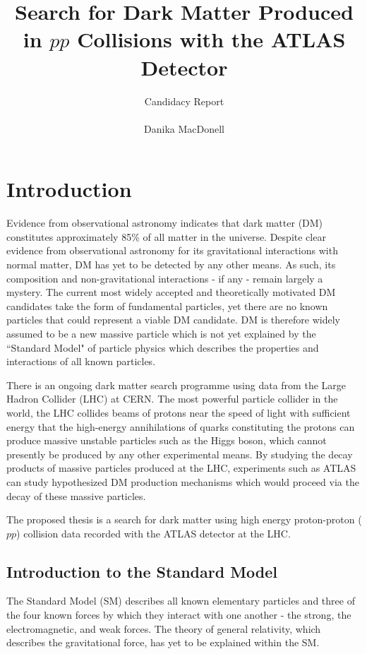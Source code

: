 \documentclass[12pt]{article}
\author{\Large{Candidacy Report} \\
\\
Danika MacDonell}
\title{Search for Dark Matter Produced in $pp$ Collisions with the ATLAS Detector}
\begin{document}
\maketitle

\section{Introduction}

Evidence from observational astronomy indicates that dark matter (DM) constitutes approximately 85\% \cite{planck} of all matter in the universe. Despite clear evidence from observational astronomy for its gravitational interactions with normal matter, DM has yet to be detected by any other means. As such, its composition and non-gravitational interactions - if any - remain largely a mystery. The current most widely accepted and theoretically motivated DM candidates take the form of fundamental particles, yet there are no known particles that could represent a viable DM candidate. DM is therefore widely assumed to be a new massive particle which is not yet explained by the ``Standard Model" of particle physics which describes the properties and interactions of all known particles. 

There is an ongoing dark matter search programme using data from the Large Hadron Collider (LHC) at CERN. The most powerful particle collider in the world, the LHC collides beams of protons near the speed of light with sufficient energy that the high-energy annihilations of quarks constituting the protons can produce massive unstable particles such as the Higgs boson, which cannot presently be produced by any other experimental means. By studying the decay products of massive particles produced at the LHC, experiments such as ATLAS can study hypothesized DM production mechanisms which would proceed via the decay of these massive particles. 

The proposed thesis is a search for dark matter using high energy proton-proton ($pp$) collision data recorded with the ATLAS detector at the LHC. 

\subsection{Introduction to the Standard Model}

The Standard Model (SM) describes all known elementary particles and three of the four known forces by which they interact with one another - the strong, the electromagnetic, and weak forces. The theory of general relativity, which describes the gravitational force, has yet to be explained within the SM. 
\end{document}
